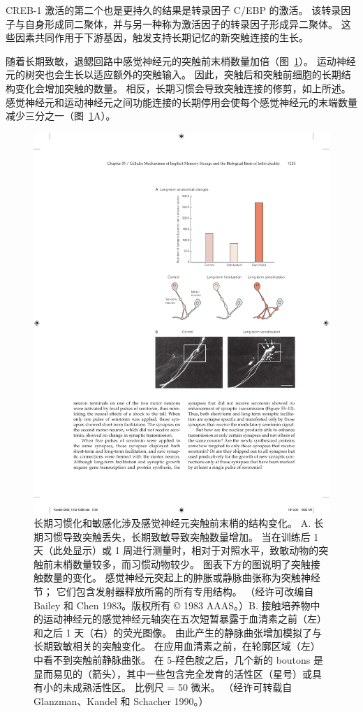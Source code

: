 CREB-1 激活的第二个也是更持久的结果是转录因子 C/EBP 的激活。
该转录因子与自身形成同二聚体，并与另一种称为激活因子的转录因子形成异二聚体。
这些因素共同作用于下游基因，触发支持长期记忆的新突触连接的生长。


随着长期致敏，退鳃回路中感觉神经元的突触前末梢数量加倍（图~\ref{fig:53_9}）。
运动神经元的树突也会生长以适应额外的突触输入。 因此，突触后和突触前细胞的长期结构变化会增加突触的数量。
相反，长期习惯会导致突触连接的修剪，如上所述。
感觉神经元和运动神经元之间功能连接的长期停用会使每个感觉神经元的末端数量减少三分之一（图~\ref{fig:53_9}A）。


\begin{figure}[htbp]
	\centering
	\includegraphics[width=0.7\linewidth]{chap53/fig_53_9}
	\caption{长期习惯化和敏感化涉及感觉神经元突触前末梢的结构变化。 A. 长期习惯导致突触丢失，长期致敏导致突触数量增加。 当在训练后 1 天（此处显示）或 1 周进行测量时，相对于对照水平，致敏动物的突触前末梢数量较多，而习惯动物较少。 图表下方的图说明了突触接触数量的变化。 感觉神经元突起上的肿胀或静脉曲张称为突触神经节； 它们包含发射器释放所需的所有专用结构。 （经许可改编自 Bailey 和 Chen 1983。版权所有 © 1983 AAAS。）B. 接触培养物中的运动神经元的感觉神经元轴突在五次短暂暴露于血清素之前（左）和之后 1 天（右）的荧光图像。 由此产生的静脉曲张增加模拟了与长期致敏相关的突触变化。 在应用血清素之前，在轮廓区域（左）中看不到突触前静脉曲张。 在 5-羟色胺之后，几个新的 boutons 是显而易见的（箭头），其中一些包含完全发育的活性区（星号）或具有小的未成熟活性区。 比例尺 = 50 微米。 （经许可转载自 Glanzman、Kandel 和 Schacher 1990。）}
	\label{fig:53_9}
\end{figure}



